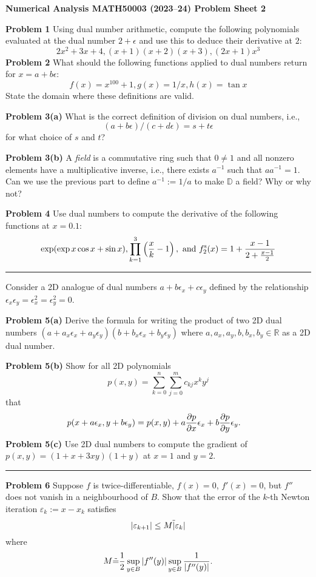\documentclass[12pt,a4paper]{article}
\def\endash{–}
\def\bbD{ {\mathbb D} }
\begin{document}
\textbf{Numerical Analysis MATH50003 (2023\ensuremath{\endash}24) Problem Sheet 2}

\textbf{Problem 1} Using dual number arithmetic, compute the following polynomials evaluated at the dual number $2+\ensuremath{\epsilon}$ and use this to deduce their derivative at $2$:
\[
2x^2 + 3x + 4, (x+1)(x+2)(x+3), (2x+1)x^3
\]
\textbf{Problem 2} What should the following functions applied to dual numbers return for $x = a+b \ensuremath{\epsilon}$:
\[
f(x) = x^{100} + 1, g(x) = 1/x, h(x) = \tan x
\]
State  the domain where these definitions are valid.

\textbf{Problem 3(a)} What is the correct definition of division on dual numbers, i.e.,
\[
(a + b \ensuremath{\epsilon} )/(c + d \ensuremath{\epsilon} ) = s + t \ensuremath{\epsilon}
\]
for what choice of $s$ and $t$? 

\textbf{Problem 3(b)} A \emph{field} is a commutative ring such that $0 \ensuremath{\neq} 1$ and all nonzero elements have a multiplicative inverse, i.e., there exists $a^{-1}$ such that $a a^{-1} = 1$. Can we use the previous part to define $a^{-1} := 1/a$ to make $\ensuremath{\bbD}$ a field? Why or why not?

\textbf{Problem 4} Use dual numbers to compute the derivative of the following functions at $x = 0.1$:
\[
\exp(\exp x \cos x + \sin x), \prod_{k=1}^3 \left({x \over k}-1\right),\hbox{ and } f^{\rm s}_2(x) = {1 + {x - 1 \over 2 + {x-1 \over 2}}}
\]
\rule{\textwidth}{1pt}
Consider a 2D analogue of dual numbers $a + b \ensuremath{\epsilon}_x + c \ensuremath{\epsilon}_y$ defined by the relationship  $\ensuremath{\epsilon}_x \ensuremath{\epsilon}_y = \ensuremath{\epsilon}_x^2 =  \ensuremath{\epsilon}_y^2 = 0$. 

\textbf{Problem 5(a)}  Derive the formula for writing the product of two 2D dual numbers $(a + a_x \ensuremath{\epsilon}_x + a_y \ensuremath{\epsilon}_y) (b + b_x \ensuremath{\epsilon}_x + b_y \ensuremath{\epsilon}_y)$ where $a,a_x,a_y,b,b_x,b_y \in \mathbb R$ as a 2D dual number.

\textbf{Problem 5(b)} Show  for all 2D polynomials
\[
p(x,y) = \sum_{k=0}^n \sum_{j=0}^m c_{kj} x^k y^j
\]
that
\begin{align*}
p(x + a \ensuremath{\epsilon}_x, y + b \ensuremath{\epsilon}_y) &= p(x,y) + a  {\ensuremath{\partial} p \over \ensuremath{\partial} x} \ensuremath{\epsilon}_x  +  b  {\ensuremath{\partial} p \over \ensuremath{\partial} y}   \ensuremath{\epsilon}_y.
\end{align*}
\textbf{Problem 5(c)} Use 2D dual numbers to compute the gradient of $p(x,y) = (1 + x + 3xy)(1+y)$ at $x=1$ and $y=2$.

\rule{\textwidth}{1pt}
\textbf{Problem 6} Suppose $f$ is twice-differentiable, $f(x) = 0$, $f'(x) = 0$, but $f''$ does not vanish in a neighbourhood of $B$. Show  that the error of the $k$-th Newton iteration $\ensuremath{\varepsilon}_k := x - x_k$ satisfies
\[
|\ensuremath{\varepsilon}_{k+1}| \ensuremath{\leq} M\ensuremath{\tilde} |\ensuremath{\varepsilon}_k|
\]
where 
\[
M\ensuremath{\tilde} ={1 \over 2} \sup_{y \in B} |f''(y)|  \sup_{y \in B} {1 \over |f''(y)|}.
\]
\end{document}
